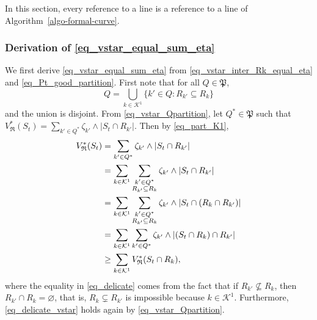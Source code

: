 \documentclass[
  11pt,
  a4paper,
]{article}
\theoremstyle{plain}
\theoremstyle{plain}
\theoremstyle{definition}
\theoremstyle{plain}
\theoremstyle{definition}
\theoremstyle{remark}
\begin{document}
In this section, every reference to a line is a reference to a line of
Algorithm~\ref{algo-formal-curve}.

\subsubsection{\texorpdfstring{Derivation of
\eqref{eq_vstar_equal_sum_eta}}{Derivation of }}\label{derivation-of}

We first derive \eqref{eq_vstar_equal_sum_eta} from
\eqref{eq_vstar_inter_Rk_equal_eta} and \eqref{eq_Pt_good_partition}.
First note that for all \(Q\in\mathfrak P\), \begin{equation}
Q=\bigcup_{k\in\mathcal{K}^1}\{ k' \in Q : R_{k'}\subseteq R_k\}
\label{eq_part_K1}
\end{equation} and the union is disjoint. From
\eqref{eq_vstar_Qpartition}, let \(Q^*\in\mathfrak P\) such that
\(V^*_{\mathfrak{R}}(S_t) = \sum_{k'\in Q^*} \zeta_{k'}\wedge |S_t\cap R_{k'}|\).
Then by \eqref{eq_part_K1}, \begin{align}
V^*_{\mathfrak{R}}(S_t) &= \sum_{k'\in Q^*} \zeta_{k'}\wedge |S_t\cap R_{k'}|\notag\\
&=\sum_{k\in\mathcal{K}^1}  \sum_{\substack{k'\in Q^*\\ R_{k'}\subseteq R_k}} \zeta_{k'}\wedge |S_t\cap R_{k'}|\notag \\
&=\sum_{k\in\mathcal{K}^1}  \sum_{\substack{k'\in Q^*\\ R_{k'}\subseteq R_k}} \zeta_{k'}\wedge |S_t\cap (R_{k}\cap R_{k'})| \notag\\
&=\sum_{k\in\mathcal{K}^1}  \sum_{k'\in Q^*} \zeta_{k'}\wedge |(S_t\cap R_{k})\cap R_{k'}| \label{eq_delicate} \\
&\geq \sum_{k\in\mathcal{K}^1} V^*_{\mathfrak{R}}(S_t\cap R_k),\label{eq_delicate_vstar}
\end{align} where the equality in \eqref{eq_delicate} comes from the
fact that if \(R_{k'}\not\subseteq R_k\), then
\(R_{k'}\cap R_k=\varnothing\), that is, \(R_{k}\subsetneq R_{k'}\) is
impossible because \(k\in\mathcal K^1\). Furthermore,
\eqref{eq_delicate_vstar} holds again by \eqref{eq_vstar_Qpartition}.
\end{document}
